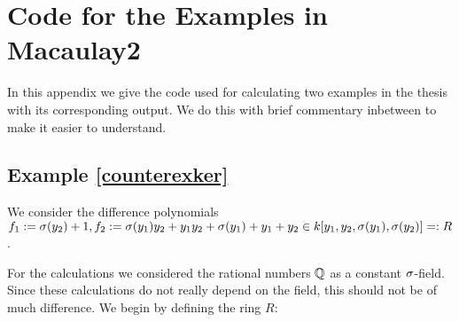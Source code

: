



\section{Code for the Examples in Macaulay2}\label{appendixcode}

In this appendix we give the code used for calculating two examples in the thesis with its corresponding output. We do this with brief commentary inbetween to make it easier to understand.

\subsection{Example \ref{counterexker}}
We consider the difference polynomials $f_1 := \sigma(y_2) + 1, f_2:= \sigma(y_1)y_2 + y_1y_2 + \sigma(y_1) + y_1 + y_2 \in k[y_1,y_2,\sigma(y_1),\sigma(y_2)] =: R$.

For the calculations we considered the rational numbers $\mathbb{Q}$ as a constant $\sigma$-field. Since these calculations do not really depend on the field, this should not be of much difference. We begin by defining the ring $R$:

